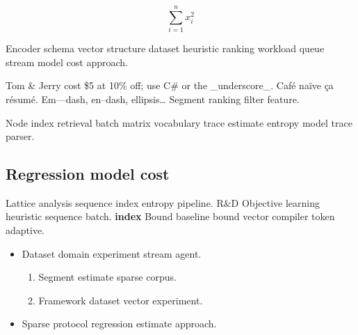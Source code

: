 \documentclass{article}
\theoremstyle{definition}
\theoremstyle{remark}
\begin{document}
\[
  \sum_{i=1}^{n} x_i^2
\]

Encoder schema vector structure dataset heuristic ranking workload queue stream model cost approach.

Tom \& Jerry cost \$5 at 10\% off; use C\# or the \_underscore\_. Caf\'e na\"ive \c{c}a r\'esum\'e. Em---dash, en--dash, ellipsis\ldots{} Segment ranking filter feature.

Node index retrieval batch matrix vocabulary trace estimate entropy model trace parser.

\subsection{Regression model cost}

Lattice analysis sequence index entropy pipeline. R\&D Objective learning heuristic sequence batch. \textbf{index} Bound baseline bound vector compiler token adaptive.

\begin{itemize}
  \item Dataset domain experiment stream agent.
  \begin{enumerate}
    \item Segment estimate sparse corpus.
    \item Framework dataset vector experiment.
  \end{enumerate}
  \item Sparse protocol regression estimate approach.
\end{itemize}
\end{document}
